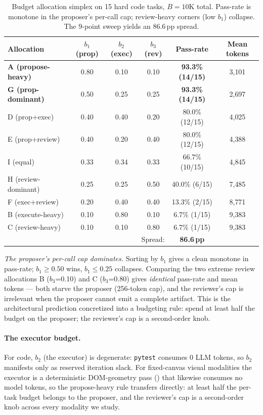 \documentclass[11pt]{article}
\begin{document}
\begin{table}[ht]
\centering
\caption{Budget allocation simplex on 15 hard code tasks, $B = 10$K total. Pass-rate is monotone in the proposer's per-call cap; review-heavy corners (low $b_1$) collapse. The 9-point sweep yields an 86.6\,pp spread.}
\label{tab:allocation}
\small
\begin{tabular}{lccccc}
\toprule
Allocation & $b_1$ (prop) & $b_2$ (exec) & $b_3$ (rev) & Pass-rate & Mean tokens \\
\midrule
\textbf{A (propose-heavy)} & 0.80 & 0.10 & 0.10 & \textbf{93.3\% (14/15)} & 3{,}101 \\
\textbf{G (prop-dominant)} & 0.50 & 0.25 & 0.25 & \textbf{93.3\% (14/15)} & 2{,}697 \\
D (prop+exec)              & 0.40 & 0.40 & 0.20 & 80.0\% (12/15) & 4{,}025 \\
E (prop+review)            & 0.40 & 0.20 & 0.40 & 80.0\% (12/15) & 4{,}388 \\
I (equal)                  & 0.33 & 0.34 & 0.33 & 66.7\% (10/15) & 4{,}845 \\
H (review-dominant)        & 0.25 & 0.25 & 0.50 & 40.0\% (6/15)  & 7{,}485 \\
F (exec+review)            & 0.20 & 0.40 & 0.40 & 13.3\% (2/15)  & 8{,}771 \\
B (execute-heavy)          & 0.10 & 0.80 & 0.10 & \phantom{0}6.7\% (1/15)  & 9{,}383 \\
C (review-heavy)           & 0.10 & 0.10 & 0.80 & \phantom{0}6.7\% (1/15)  & 9{,}383 \\
\midrule
\multicolumn{4}{r}{Spread:} & \textbf{86.6\,pp} & \\
\bottomrule
\end{tabular}
\end{table}

\emph{The proposer's per-call cap dominates.} Sorting by $b_1$ gives a clean monotone in pass-rate; $b_1 \geq 0.50$ wins, $b_1 \leq 0.25$ collapses. Comparing the two extreme review allocations B (\texttt{$b_3$}=0.10) and C (\texttt{$b_3$}=0.80) gives \emph{identical} pass-rate and mean tokens --- both starve the proposer (256-token cap), and the reviewer's cap is irrelevant when the proposer cannot emit a complete artifact. This is the architectural prediction concretized into a budgeting rule: spend at least half the budget on the proposer; the reviewer's cap is a second-order knob.

\paragraph{The executor budget.} For code, $b_2$ (the executor) is degenerate: \texttt{pytest} consumes 0 LLM tokens, so $b_2$ manifests only as reserved iteration slack. For fixed-canvas visual modalities the executor is a deterministic DOM-geometry pass () that likewise consumes no model tokens, so the propose-heavy rule transfers directly: at least half the per-task budget belongs to the proposer, and the reviewer's cap is a second-order knob across every modality we study.
\end{document}
